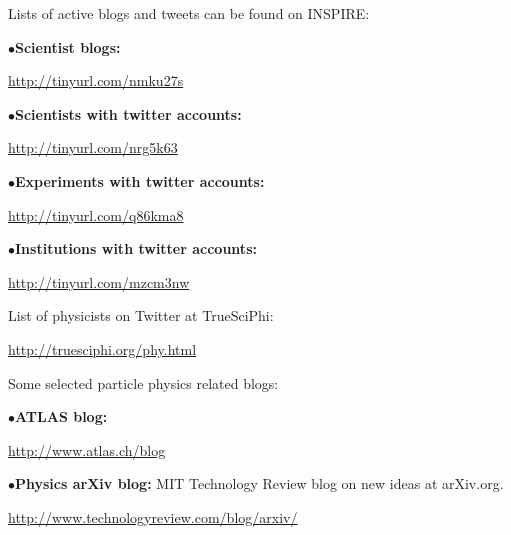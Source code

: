 
\medskip


\medskip

Lists of active blogs and tweets can be found on INSPIRE:

\item{$\bullet$}{\bf Scientist blogs:} 
	\item{}\qquad\url{http://tinyurl.com/nmku27s}

\item{$\bullet$}{\bf Scientists with twitter accounts:} 
	\item{}\qquad\url{http://tinyurl.com/nrg5k63}

\item{$\bullet$}{\bf Experiments with twitter accounts:} 
	\item{}\qquad\url{http://tinyurl.com/q86kma8}

\item{$\bullet$}{\bf Institutions with twitter accounts:} 
	\item{}\qquad\url{http://tinyurl.com/mzcm3nw}


\medskip


List of physicists on Twitter at TrueSciPhi:

	\item{}\qquad\url{http://truesciphi.org/phy.html}

\medskip


\newpage
Some selected particle physics related blogs:
 
\medskip

\item{$\bullet$}{\bf ATLAS blog:}
	\item{}\qquad\url{http://www.atlas.ch/blog}

\medskip

\item{$\bullet$}{\bf Physics arXiv blog:}
MIT Technology Review blog on new ideas at arXiv.org.
	\item{}\qquad\url{http://www.technologyreview.com/blog/arxiv/}



